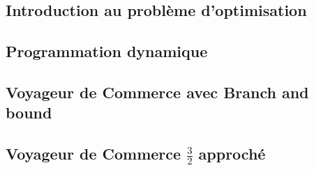 \subsection{Introduction au problème d'optimisation}


\subsection{Programmation dynamique}


\pagebreak

\subsection{Voyageur de Commerce avec Branch and bound}


\subsection{Voyageur de Commerce $\frac{3}{2}$ approché}

